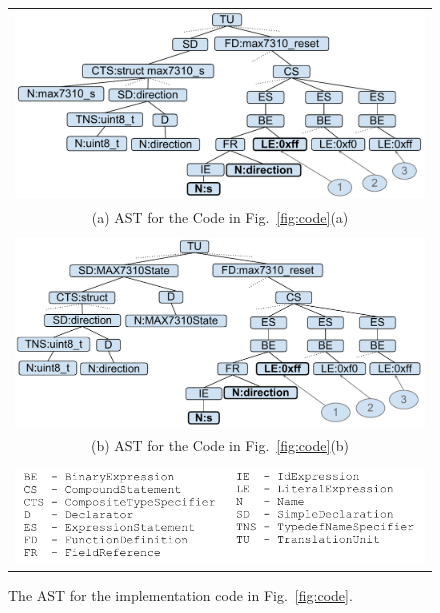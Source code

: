 \begin{figure}[h!]
  \begin{center}
    \begin{tabular}{c}
\begin{minipage}[b]{\linewidth}
  \centering
  \includegraphics[width=0.8\linewidth]{ast1}
\end{minipage}\\
(a) AST for the Code in Fig.~\ref{fig:code}(a)\\
\\
\begin{minipage}[b]{\linewidth}
  \centering
  \includegraphics[width=0.8\linewidth]{ast2}
\end{minipage}\\
(b) AST for the Code in Fig.~\ref{fig:code}(b)\\
\\
\begin{minipage}[b]{\linewidth}
  \centering
  \includegraphics[width=0.95\linewidth]{ast_legend}
\end{minipage}
\end{tabular}
\caption{The AST for the implementation code in Fig.~\ref{fig:code}.}
\label{fig:ast}
\end{center}
\end{figure}

